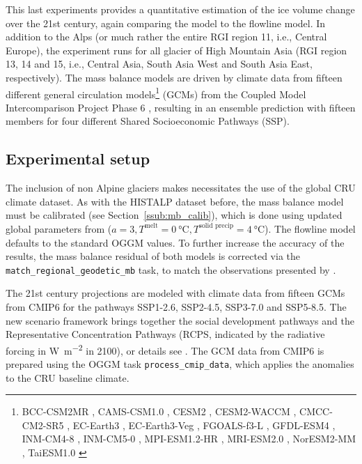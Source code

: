     This last experiments provides a quantitative estimation of the ice volume change over the 21st century, again comparing the \vas{} model to the flowline model. In addition to the Alps (or much rather the entire RGI region 11, i.e., Central Europe), the experiment runs for all glacier of High Mountain Asia (RGI region 13, 14 and 15, i.e., Central Asia, South Asia West and South Asia East, respectively). The mass balance models are driven by climate data from fifteen different general circulation models\footnote{ BCC-CSM2MR \citep{CMIP6-BCC-CSM2MR}, CAMS-CSM1.0 \citep{CMIP6-CAMS-CSM1.0}, CESM2 \citep{CMIP6-CESM2}, CESM2-WACCM \citep{CMIP6-CESM2-WACCM}, CMCC-CM2-SR5 \citep{CMIP6-CMCC-CM2-SR5}, EC-Earth3 \citep{CMIP6-EC-Earth3}, EC-Earth3-Veg \citep{CMIP6-EC-Earth3-Veg}, FGOALS-f3-L \citep{CMIP6-FGOALS-f3-L}, GFDL-ESM4 \citep{CMIP6-GFDL-ESM4}, INM-CM4-8 \citep{CMIP6-INM-CM4-8}, INM-CM5-0 \citep{CMIP6-INM-CM5-0}, MPI-ESM1.2-HR \citep{CMIP6-MPI-ESM1.2-HR-DKRZ, CMIP6-MPI-ESM1.2-HR-DWD}, MRI-ESM2.0 \citep{CMIP6-MRI-ESM2.0}, NorESM2-MM \citep{CMIP6-NorESM2-MM}, TaiESM1.0 \citep{CMIP6-TaiESM1.0}} (GCMs) from the Coupled Model Intercomparison Project Phase 6 \citep[CMIP6, ][]{Eyring2016_CMIP}, resulting in an ensemble prediction with fifteen members for four different Shared Socioeconomic Pathways (SSP).

    \subsection{Experimental setup} %
    \label{sub:experimental_setup_projections}

      The inclusion of non Alpine glaciers makes necessitates the use of the global CRU climate dataset. As with the HISTALP dataset before, the \vas{} mass balance model must be calibrated (see Section~\ref{ssub:mb_calib}), which is done using updated global parameters from \citet{Malles2020} ($a = 3, T^\text{melt} = \SI{0}{\celsius}, T^\text{solid precip} = \SI{4}{\celsius}$). The flowline model defaults to the standard OGGM values. To further increase the accuracy of the results, the mass balance residual \bias{} of both models is corrected via the \lstinline`match_regional_geodetic_mb` task, to match the observations presented by \citet{Davaze2020}.

      The 21st century projections are modeled with climate data from fifteen GCMs from CMIP6 for the pathways SSP1-2.6, SSP2-4.5, SSP3-7.0 and SSP5-8.5. The new scenario framework brings together the social development pathways and the Representative Concentration Pathways (RCPS, indicated by the radiative forcing in \si{\watt\per\square\meter} in 2100), or details see \citet{ONeill2016, Riahi2017}.  The GCM data from CMIP6 is prepared using the OGGM task \lstinline`process_cmip_data`, which applies the anomalies to the CRU baseline climate.
      
